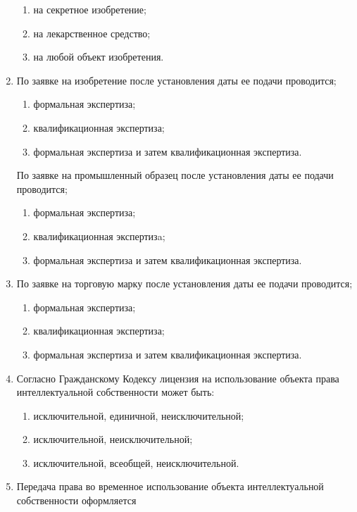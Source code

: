\begin{enumerate}
    \begin{enumerate}
        \item на секретное изобретение;
        \item \cmark на лекарственное средство;
        \item на любой объект изобретения.
    \end{enumerate}
    \item По заявке на изобретение после установления даты ее подачи проводится;
    \begin{enumerate}
        \item формальная экспертиза;
        \item квалификационная экспертиза; 
        \item \cmark формальная экспертиза и затем квалификационная экспертиза.
    \end{enumerate}
    По заявке на промышленный образец после установления даты ее подачи проводится;
    \begin{enumerate}
        \item формальная экспертиза;
        \item квалификационная экспертизa; 
        \item \cmark формальная экспертиза и затем квалификационная экспертиза.
    \end{enumerate}
    \item По заявке на торговую марку после установления даты ее подачи проводится;
    \begin{enumerate}
        \item формальная экспертиза;
        \item квалификационная экспертиза; 
        \item \cmark формальная экспертиза и затем квалификационная экспертиза.
    \end{enumerate}
    \item Согласно Гражданскому Кодексу лицензия на использование объекта права интеллектуальной собственности может быть:
    \begin{enumerate}
        \item \cmark исключительной, единичной, неисключительной;
        \item исключительной,  неисключительной;
        \item исключительной, всеобщей, неисключительной. 
    \end{enumerate}
    \item Передача права во временное использование объекта интеллектуальной собственности оформляется 

\end{enumerate}
